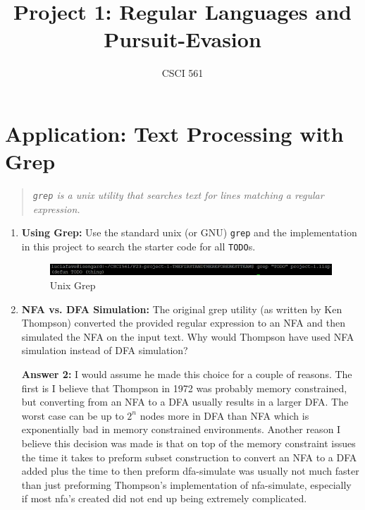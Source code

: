 \documentclass[12pt,letterpaper]{ntdhw}
\title{Project 1: Regular Languages and Pursuit-Evasion}
\author{CSCI 561}
\begin{document}
\pagestyle{fancyplain}

\maketitle
\thispagestyle{fancyplain}



\section*{Application: Text Processing with Grep}

\begin{quote}
  \emph{\texttt{grep} is a unix utility that searches text for lines
    matching a regular expression.}
\end{quote}

\begin{enumerate}
  \item \textbf{Using Grep:} Use the standard unix (or GNU)
  \texttt{grep} and the implementation in this project to search the
  starter code for all \texttt{TODO}s.
  \begin{figure}[htp]
    \centering
    \includegraphics[width=17cm]{unixGrep.JPG}
    \caption{Unix Grep}
\end{figure}

  \item \textbf{NFA vs. DFA Simulation:} The original grep utility (as
  written by Ken Thompson) converted the provided regular expression
  to an NFA and then simulated the NFA on the input text.  Why would
  Thompson have used NFA simulation instead of DFA simulation?
  \par \textbf{Answer 2:} I would assume he made this choice for a couple of reasons. The first is I believe that Thompson in 1972 was probably memory constrained, but converting from an NFA to a DFA usually results in a larger DFA. The worst case can be up to $2^n$ nodes more in DFA than NFA  which is exponentially bad in memory constrained environments. Another reason I believe this decision was made is that on top of the memory constraint issues the time it takes to preform subset construction to convert an NFA to a DFA added plus the time to then preform dfa-simulate was usually not much faster than just preforming Thompson's implementation of  nfa-simulate, especially if most nfa's created did not end up being extremely complicated. 


\end{enumerate}
\end{document}

